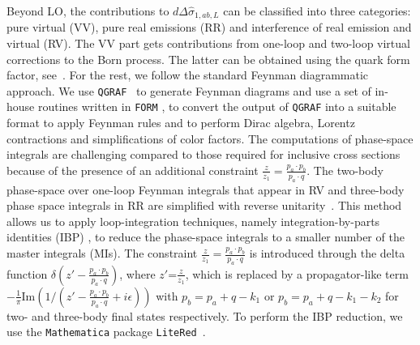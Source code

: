 \documentclass[%
 twocolumn,
 superscriptaddress,
 preprintnumbers,
 nofootinbib,
 amsmath,amssymb,
 aps,
 prl,
]{revtex4}
\begin{document}
{Beyond LO, the contributions to $d \Delta \hat{\sigma}_{1,ab,L}$ can be classified into three categories: pure virtual (VV),
pure real emissions (RR) and interference of real emission and virtual (RV). 
The VV part gets contributions from one-loop and two-loop virtual corrections to the Born process.  The latter can
be obtained using the quark form factor, see~\cite{Lee:2022nhh}.  
For the rest, we follow
the standard Feynman diagrammatic approach. We use \texttt{QGRAF}~\cite{Nogueira:1991ex} 
to generate Feynman diagrams and use a set of in-house routines written in 
\texttt{FORM} \cite{Kuipers:2012rf,Ruijl:2017dtg}, to convert the output of
\texttt{QGRAF} into a suitable format to apply Feynman rules and to perform Dirac algebra, Lorentz contractions and simplifications of color factors.  
The computations of phase-space integrals are
challenging compared to those required for inclusive cross sections because of the presence of an additional constraint 
$\frac{z}{z_{1}} = \frac{p_a \cdot p_b}{p_a\cdot q}$. 
The two-body phase-space over one-loop Feynman integrals that appear in RV and
three-body phase space integrals in RR are simplified with reverse unitarity~\cite{Anastasiou:2003gr,Anastasiou:2012kq}. 
This method allows us to apply loop-integration techniques, namely 
integration-by-parts identities (IBP) \cite{Chetyrkin:1981qh,Laporta:2001dd}, 
to reduce the phase-space integrals to a smaller number of the master integrals (MIs). 
The constraint $\frac{z}{z_{1}}= \frac{p_a \cdot p_b}{p_a \cdot q}$ is introduced through the delta function $\delta \left(z' - \frac{p_a \cdot p_b}{p_a \cdot q} \right)$, 
where $z'$=$\frac{z}{z_1}$, which is replaced by a propagator-like term 
$-\frac{1}{\pi}\text{Im}(1/(z' - \frac{p_a \cdot p_b}{p_a \cdot q} + i \epsilon))$ 
with $p_b = p_a + q - k_1$ or $p_b = p_a + q - k_1 - k_2$ 
for two- and three-body final states respectively.
To perform the IBP reduction, we use the \texttt{Mathematica} package \texttt{LiteRed}~\cite{Lee:2013mka}.   


}
\end{document}
